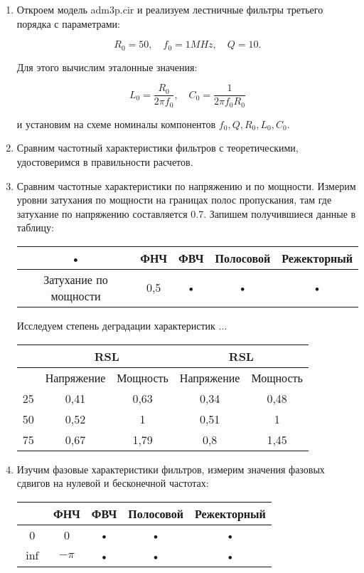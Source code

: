 \documentclass[a4paper, 12pt]{article}%
\begin{document}
\begin{enumerate}

\item Откроем модель adm3p.cir и реализуем лестничные фильтры третьего порядка с параметрами:

\[R_0 = 50, \quad f_0 = 1MHz, \quad Q = 10.\]

Для этого вычислим эталонные значения:

\[L_0 = \frac{R_0}{2\pi f_0}, \quad C_0 = \frac{1}{2 \pi f_0 R_0}\]

и установим на схеме номиналы компонентов $f_0, Q, R_0, L_0, C_0$.

\item Сравним частотный характеристики фильтров с теоретическими, удостоверимся в правильности расчетов.

\item Сравним частотные характеристики по напряжению и по мощности. Измерим уровни затухания по мощности на границах полос пропускания, там где затухание по напряжению составляется 0.7. Запишем получившиеся данные в таблицу:

\begin{center}
\begin{tabular}{|c|c|c|c|c|}
\hline 
• & ФНЧ & ФВЧ & Полосовой & Режекторный \\ 
\hline 
Затухание по мощности & 0,5 & • & • & • \\ 
\hline 
\end{tabular} 
\end{center}

Исследуем степень деградации характеристик ... %

\begin{center}
\begin{tabular}{|c|c|c|c|c|}
\hline 
 & \multicolumn{2}{c|}{RSL} & \multicolumn{2}{c|}{RSL} \\ 
\hline 
 & Напряжение & Мощность & Напряжение & Мощность \\ 
\hline 
25 & 0,41 & 0,63 & 0,34 & 0,48 \\ 
\hline 
50 & 0,52 & 1 & 0,51 & 1 \\ 
\hline 
75 & 0,67 & 1,79 & 0,8 & 1,45 \\ 
\hline 
\end{tabular} 
\end{center}

\item Изучим фазовые характеристики фильтров, измерим значения фазовых сдвигов на нулевой и бесконечной частотах:

\begin{tabular}{|c|c|c|c|c|}
\hline 
 & ФНЧ & ФВЧ & Полосовой & Режекторный \\ 
\hline 
0 & 0 & • & • & • \\ 
\hline 
$\inf$ & $-\pi$ & • & • & • \\ 
\hline 
\end{tabular} 

\end{enumerate}
\end{document}
